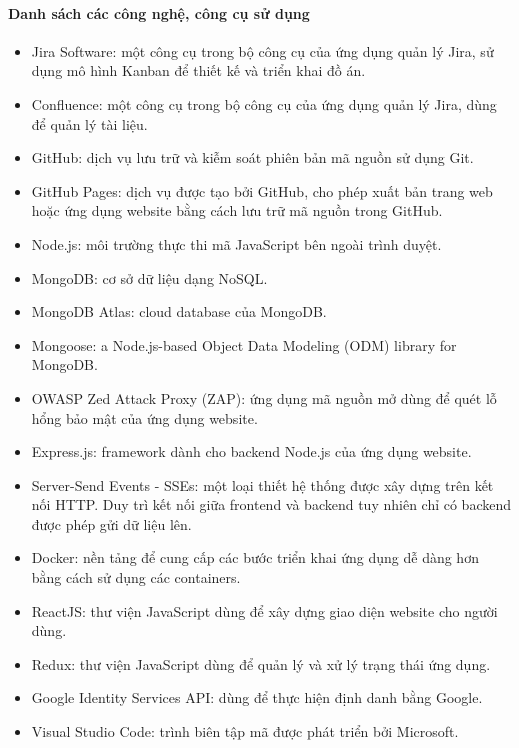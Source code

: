\paragraph{Danh sách các công nghệ, công cụ sử dụng}
\begin{itemize}
    \item Jira Software: một công cụ trong bộ công cụ của ứng dụng quản lý Jira, sử dụng mô hình Kanban để thiết kế và triển khai đồ án.
    \item Confluence: một công cụ trong bộ công cụ của ứng dụng quản lý Jira, dùng để quản lý tài liệu.
    \item GitHub: dịch vụ lưu trữ và kiễm soát phiên bản mã nguồn sử dụng Git.
    \item GitHub Pages: dịch vụ được tạo bởi GitHub, cho phép xuất bản trang web hoặc ứng dụng website bằng cách lưu trữ mã nguồn trong GitHub.
    \item Node.js: môi trường thực thi mã JavaScript bên ngoài trình duyệt.
    \item MongoDB: cơ sở dữ liệu dạng NoSQL.
    \item MongoDB Atlas: cloud database của MongoDB.
    \item Mongoose: a Node.js-based Object Data Modeling (ODM) library for MongoDB.
    \item OWASP Zed Attack Proxy (ZAP): ứng dụng mã nguồn mở dùng để quét lỗ hổng bảo mật của ứng dụng website.
    \item Express.js: framework dành cho backend Node.js của ứng dụng website.
    \item Server-Send Events - SSEs: một loại thiết hệ thống được xây dựng trên kết nối HTTP. Duy trì kết nối giữa frontend và backend tuy nhiên chỉ có backend được phép gửi dữ liệu lên.
    \item Docker: nền tảng để cung cấp các bước triển khai ứng dụng dễ dàng hơn bằng cách sử dụng các containers.
    \item ReactJS: thư viện JavaScript dùng để xây dựng giao diện website cho người dùng.
    \item Redux: thư viện JavaScript dùng để quản lý và xử lý trạng thái ứng dụng.
    \item Google Identity Services API: dùng để thực hiện định danh bằng Google.
    \item Visual Studio Code: trình biên tập mã được phát triển bởi Microsoft.
\end{itemize}